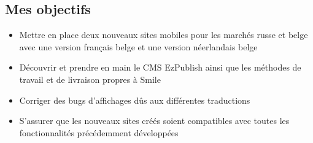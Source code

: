 \documentclass[a4paper,11pt,twoside]{report}
\begin{document}
    \subsection*{Mes objectifs}
      \begin{itemize}

	\item Mettre en place deux nouveaux sites mobiles pour les marchés russe et belge avec une version français belge et une version néerlandais belge
	\item Découvrir et prendre en main le CMS EzPublish ainsi que les méthodes de travail et de livraison propres à Smile
	\item Corriger des bugs d'affichages dûs aux différentes traductions
	\item S'assurer que les nouveaux sites créés soient compatibles avec toutes les fonctionnalités précédemment développées

      \end{itemize}
\end{document}
